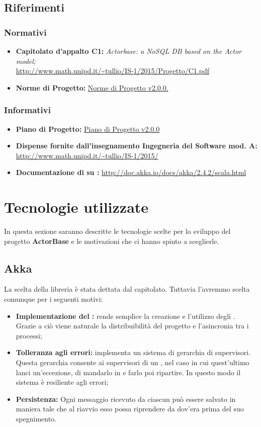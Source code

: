 \documentclass{scalatekids-article}
\begin{document}
\subsection{Riferimenti}
\subsubsection{Normativi}
\begin{itemize}
\item\textbf{Capitolato d'appalto C1:} \textit{Actorbase: a NoSQL DB based on the Actor model;}\\
  \url{http://www.math.unipd.it/~tullio/IS-1/2015/Progetto/C1.pdf}
\item\textbf{Norme di Progetto:} \href{run:../Interni/NormeDiProgetto\_v2.0.0.pdf}{Norme di Progetto v2.0.0.}
\end{itemize}
\subsubsection{Informativi}
\begin{itemize}
\item\textbf{Piano di Progetto:} \href{run:./PianoDiProgetto\_v2.0.0.pdf}{Piano di Progetto v2.0.0}
\item\textbf{Dispense fornite dall'insegnamento Ingegneria del Software mod. A:}\\
  \url{http://www.math.unipd.it/~tullio/IS-1/2015/}
\item\textbf{Documentazione di  su :}
  \url{http://doc.akka.io/docs/akka/2.4.2/scala.html}
\end{itemize}
\newpage
\section{Tecnologie utilizzate}
In questa sezione saranno descritte le tecnologie scelte per lo sviluppo del progetto \textbf{ActorBase} e le motivazioni che ci hanno spinto a sceglierle.
\subsection{Akka}
La scelta della libreria  è stata dettata dal capitolato. Tuttavia l'avremmo scelta comunque per i seguenti motivi:
\begin{itemize}
\item\textbf{Implementazione del :}  rende semplice la creazione e l'utilizzo degli . Grazie a ciò viene naturale la distribuibilità del progetto e l'asincronia tra i processi;
\item\textbf{Tolleranza agli errori:}  implementa un sistema di gerarchia di supervisori. Questa gerarchia consente ai supervisori di un , nel caso in cui quest'ultimo lanci un'eccezione, di mandarlo in  e farlo poi ripartire. In questo modo il sistema è resiliente agli errori;
\item\textbf{Persistenza:} Ogni messaggio ricevuto da ciascun  può essere salvato in maniera tale che al riavvio esso possa riprendere da dov'era prima del suo spegnimento.
\end{itemize}
\end{document}
